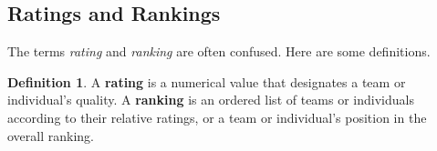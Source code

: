 \documentclass[
]{book}
\theoremstyle{definition}
\newtheorem{definition}{Definition}[chapter]
\theoremstyle{definition}
\theoremstyle{definition}
\theoremstyle{definition}
\theoremstyle{remark}
\begin{document}
\subsection*{Ratings and Rankings}\label{ratings-and-rankings}

The terms \emph{rating} and \emph{ranking} are often confused. Here are some definitions.

\begin{defbox}

\begin{definition}
A \textbf{rating} is a numerical value that designates a team or individual's quality. A \textbf{ranking} is an ordered list of teams or individuals according to their relative ratings, or a team or individual's position in the overall ranking.
\end{definition}

\end{defbox}
\end{document}
